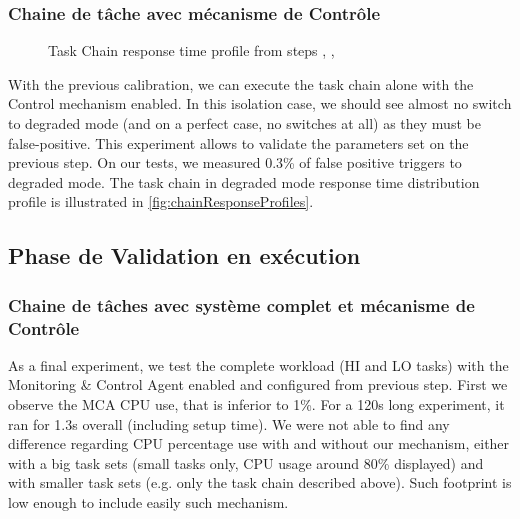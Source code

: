 \documentclass[french, a4paper, 11pt, twoside, pdftex]{StyleThese}
\begin{document}
            \subsubsection{Chaine de tâche avec mécanisme de Contrôle}
                    \begin{figure}[ht]
                        \begin{adjustbox}{clip,trim=0.3cm 0.18cm 1.2cm 1cm,max width=\linewidth}   %
                        
                        \end{adjustbox}
                        \caption{Task Chain response time profile from steps \circleTxt[3], \circleTxt[6], \circleTxt[7]}
                        \label{fig:chainResponseProfiles}
                    \end{figure}
                        With the previous calibration, we can execute the task chain alone with the Control mechanism enabled. In this isolation case, we should see almost no switch to degraded mode (and on a perfect case, no switches at all) as they must be false-positive. 
                        This experiment allows to validate the parameters set on the previous step.
                        On our tests, we measured 0.3\% of false positive triggers to degraded mode. The task chain in degraded mode response time distribution profile is illustrated in \autoref{fig:chainResponseProfiles}.
            
        \subsection{Phase de Validation en exécution}
            \subsubsection{Chaine de tâches avec système complet et mécanisme de Contrôle}
                    As a final experiment, we test the complete workload (HI and LO tasks) with the Monitoring \& Control Agent enabled and configured from previous step. 
                    First we observe the MCA CPU use, that is inferior to 1\%. For a 120s long experiment, it ran for 1.3s overall (including setup time). We were not able to find any difference regarding CPU percentage use with and without our mechanism, either with a big task sets (small tasks only, CPU usage around 80\% displayed) and with smaller task sets (e.g. only the task chain described above). Such footprint is low enough to include easily such mechanism. 
     
\end{document}
